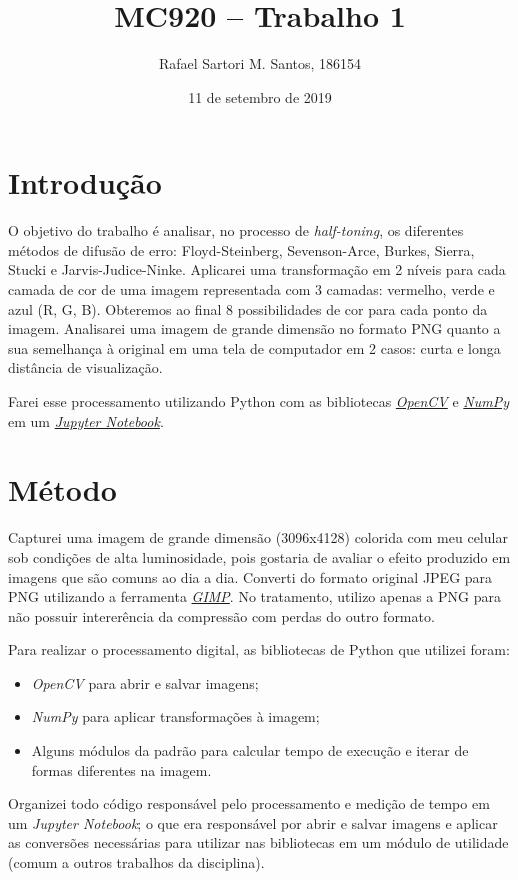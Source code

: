 \documentclass[brazilian,a4paper,twocolumn]{article}
\title{MC920 -- Trabalho 1}
\author{Rafael Sartori M. Santos, 186154}
\date{11 de setembro de 2019}
\begin{document}
\maketitle

\section{Introdução}

    O objetivo do trabalho é analisar, no processo de \textit{half-toning}, os diferentes métodos de difusão de erro: Floyd-Steinberg, Sevenson-Arce, Burkes, Sierra, Stucki e Jarvis-Judice-Ninke. Aplicarei uma transformação em 2 níveis para cada camada de cor de uma imagem representada com 3 camadas: vermelho, verde e azul (R, G, B). Obteremos ao final $8$ possibilidades de cor para cada ponto da imagem. Analisarei uma imagem de grande dimensão no formato PNG quanto a sua semelhança à original em uma tela de computador em 2 casos: curta e longa distância de visualização.

    Farei esse processamento utilizando Python com as bibliotecas \href{https://opencv.org/}{\emph{OpenCV}} e \href{https://numpy.org/}{\emph{NumPy}} em um \href{https://jupyter.org/}{\emph{Jupyter Notebook}}.


\section{Método}

    Capturei uma imagem de grande dimensão (3096x4128) colorida com meu celular sob condições de alta luminosidade, pois gostaria de avaliar o efeito produzido em imagens que são comuns ao dia a dia. Converti do formato original JPEG para PNG utilizando a ferramenta \href{https://www.gimp.org/}{\emph{GIMP}}. No tratamento, utilizo apenas a PNG para não possuir intererência da compressão com perdas do outro formato.

    Para realizar o processamento digital, as bibliotecas de Python que utilizei foram:
    \begin{itemize}
        \item \emph{OpenCV} para abrir e salvar imagens;
        \item \emph{NumPy} para aplicar transformações à imagem;
        \item Alguns módulos da padrão para calcular tempo de execução e iterar de formas diferentes na imagem.
    \end{itemize}
    Organizei todo código responsável pelo processamento e medição de tempo em um \emph{Jupyter Notebook}; o que era responsável por abrir e salvar imagens e aplicar as conversões necessárias para utilizar nas bibliotecas em um módulo de utilidade (comum a outros trabalhos da disciplina).
\end{document}
